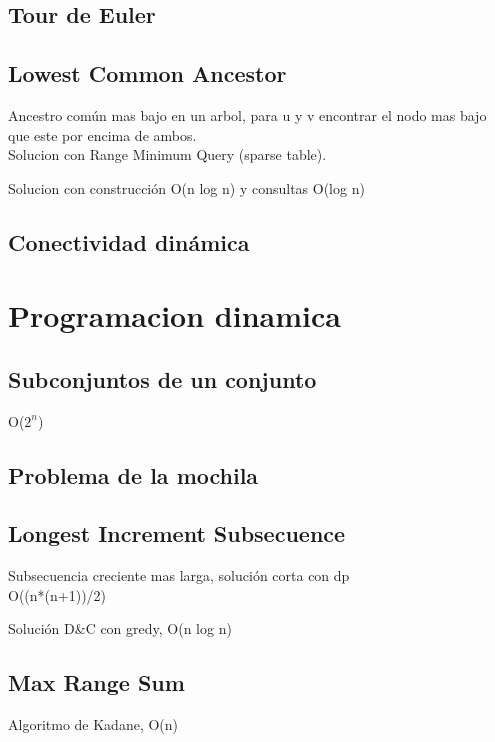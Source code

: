 \documentclass[10pt,landscape,twocolumn,letterpaper,twosided]{article}
\newcommand\cppfile[2][]{

}
\begin{document}
			\subsection{Tour de Euler}
			\cppfile[10-33]{grafos/tour_euleriano.cpp}
			\subsection{Lowest Common Ancestor}
			Ancestro común mas bajo en un arbol, para u y v encontrar el nodo mas bajo que este por encima de
			ambos.\\
			Solucion con Range Minimum Query (sparse table).
			\cppfile[38-65]{otros/Lowest_Common_Ancestor.cpp}
			Solucion con construcción O(n log n) y consultas O(log n)
			\cppfile[11-77]{otros/Lowest_Common_Ancestor_logN.cpp}
			\subsection{Conectividad dinámica}
			\cppfile[7-70]{grafos/conectividad_dinamica.cpp}			
			
		\section{Programacion dinamica}
			\subsection{Subconjuntos de un conjunto}
			O($2^{n}$)
			\cppfile[6-15]{programacion_dinamica/bitmask.cpp}
			\subsection{Problema de la mochila}
			\cppfile[8-23]{programacion_dinamica/knapsack.cpp}
			\subsection{Longest Increment Subsecuence}
			Subsecuencia creciente mas larga, solución corta con dp\\
			O((n*(n+1))/2)
			\cppfile[48-57]{programacion_dinamica/longest_increasing_subsequence.cpp}
			Solución D{\&}C con gredy, O(n log n)
			\cppfile[7-46]{programacion_dinamica/longest_increasing_subsequence.cpp}
			\subsection{Max Range Sum}
			Algoritmo de Kadane, O(n)
			\cppfile[6-22]{programacion_dinamica/Max_Range_Sum.cpp}
\end{document}
